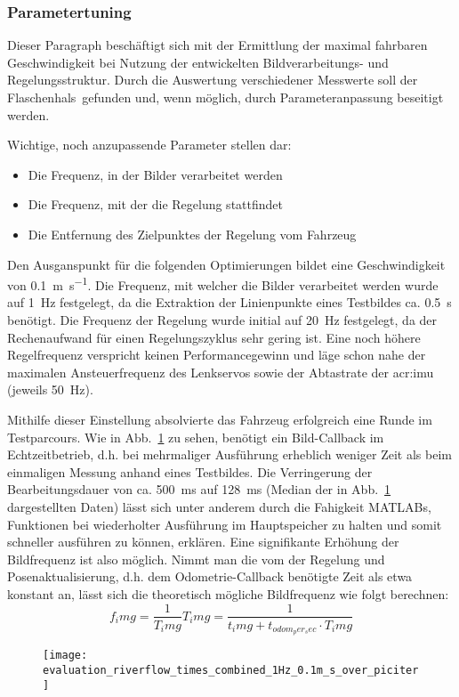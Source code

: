 \subsubsection{Parametertuning}
Dieser Paragraph beschäftigt sich mit der Ermittlung der maximal fahrbaren Geschwindigkeit bei Nutzung der entwickelten Bildverarbeitungs- und Regelungsstruktur. Durch die Auswertung verschiedener Messwerte soll der \glqq Flaschenhals\grqq\ gefunden und, wenn möglich, durch Parameteranpassung beseitigt werden.

Wichtige, noch anzupassende Parameter stellen dar:
\begin{itemize}
\item Die Frequenz, in der Bilder verarbeitet werden
\item Die Frequenz, mit der die Regelung stattfindet
\item Die Entfernung des Zielpunktes der Regelung vom Fahrzeug
\end{itemize}

Den Ausganspunkt für die folgenden Optimierungen bildet eine Geschwindigkeit von
\SI{0.1}{\metre\per\second}. Die Frequenz, mit welcher die Bilder verarbeitet werden wurde auf \SI{1}{\hertz} festgelegt, da die Extraktion der Linienpunkte eines Testbildes ca. \SI{0.5}{\second} benötigt. Die Frequenz der Regelung wurde initial auf \SI{20}{\hertz} festgelegt, da der Rechenaufwand für einen Regelungszyklus sehr gering ist. Eine noch höhere Regelfrequenz verspricht keinen Performancegewinn und läge schon nahe der maximalen Ansteuerfrequenz des Lenkservos sowie der Abtastrate der \gls{acr:imu} (jeweils \SI{50}{\hertz}).

Mithilfe dieser Einstellung absolvierte das Fahrzeug erfolgreich eine Runde im Testparcours. Wie in Abb.~\ref{fig:evaluation:riverflow:times_combined_1Hz_0.1m_s_over_piciter} zu sehen, benötigt ein Bild-Callback im Echtzeitbetrieb, d.h. bei mehrmaliger Ausführung erheblich weniger Zeit als beim einmaligen Messung anhand eines Testbildes. Die Verringerung der Bearbeitungsdauer von ca. \SI{500}{\milli\second} auf \SI{128}{\milli\second} (Median der in Abb.~\ref{fig:evaluation:riverflow:times_combined_1Hz_0.1m_s_over_piciter} dargestellten Daten) lässt sich unter anderem durch die Fahigkeit MATLABs, Funktionen bei wiederholter Ausführung im Hauptspeicher zu halten und somit schneller ausführen zu können, erklären. Eine signifikante Erhöhung der Bildfrequenz ist also möglich.
Nimmt man die vom der Regelung und Posenaktualisierung, d.h. dem Odometrie-Callback benötigte Zeit als etwa konstant an, lässt sich die theoretisch mögliche Bildfrequenz wie folgt berechnen:
\begin{subequations}
\begin{equation}	
	f_img = \frac{1}{T_img}
\end{equation}
\begin{equation}
	T_img = \frac{1}{t_img+t_{odom_per_sec}\cdot T_img}
\end{equation}
\end{subequations} 

\begin{figure}[ht] %
	\centering
	\texttt{[image: evaluation\_riverflow\_times\_combined\_1Hz\_0.1m\_s\_over\_piciter]}
	\label{fig:evaluation:riverflow:times_combined_1Hz_0.1m_s_over_piciter}
\end{figure}